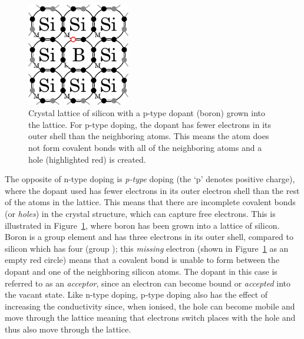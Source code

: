 \begin{figure}[t]
\begin{center}
\includegraphics[width = 0.4\textwidth]{figures/p_type_doping}
\caption[Crystal lattice of silicon with a p-type dopant inserted.]{Crystal lattice of silicon with a p-type dopant (boron) grown into the lattice. For p-type doping, the dopant has fewer electrons in its outer shell than the neighboring atoms. This means the atom does not form covalent bonds with all of the neighboring atoms and a hole (highlighted red) is created.}
\label{fig:pTypeDoing}
\end{center}
\end{figure}
\par
The opposite of n-type doping is \textit{p-type} doping (the `p' denotes positive charge), where the dopant used has fewer electrons in its outer electron shell than the rest of the atoms in the lattice. This means that there are incomplete covalent bonds (or \textit{holes}) in the crystal structure, which can capture free electrons. This is illustrated in Figure~\ref{fig:pTypeDoing}, where boron has been grown into a lattice of silicon. Boron is a group  element and has three electrons in its outer shell, compared to silicon which has four (group ); this \textit{missing} electron (shown in Figure~\ref{fig:pTypeDoing} as an empty red circle) means that a covalent bond is unable to form between the dopant and one of the neighboring silicon atoms. The dopant in this case is referred to as an \textit{acceptor}, since an electron can become bound or \textit{accepted} into the vacant state. Like n-type doping, p-type doping also has the effect of increasing the conductivity since, when ionised, the hole can become mobile and move through the lattice meaning that electrons switch places with the hole and thus also move through the lattice.
